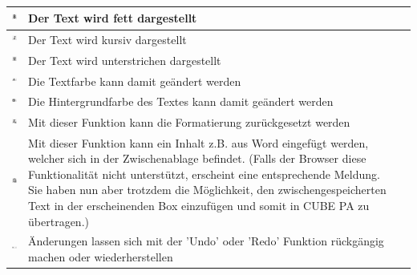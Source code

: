 \begin{tabular}{c | p{14cm} l} %
\hline
\includegraphics[height=12pt]{../chapters/09_Qualitaetsmanagement/pictures/Format/Fett.jpg} & Der Text wird fett dargestellt \\
\hline
\includegraphics[height=12pt]{../chapters/09_Qualitaetsmanagement/pictures/Format/Kursiv.jpg} & Der Text wird kursiv dargestellt \\
\hline
\includegraphics[height=12pt]{../chapters/09_Qualitaetsmanagement/pictures/Format/Unterstrichen.jpg} & Der Text wird unterstrichen dargestellt \\
\hline
\includegraphics[height=12pt]{../chapters/09_Qualitaetsmanagement/pictures/Format/Textfarbe.jpg} & Die Textfarbe kann damit geändert werden \\
\hline
\includegraphics[height=12pt]{../chapters/09_Qualitaetsmanagement/pictures/Format/Hintergrundfarbe.jpg} & Die Hintergrundfarbe des Textes kann damit geändert werden \\
\hline
\includegraphics[height=12pt]{../chapters/09_Qualitaetsmanagement/pictures/Format/Form_z.jpg} & Mit dieser Funktion kann die Formatierung zurückgesetzt werden \\
\hline
\includegraphics[height=12pt]{../chapters/09_Qualitaetsmanagement/pictures/Format/ausWord.jpg} & Mit dieser Funktion kann ein Inhalt z.B. aus Word eingefügt werden, welcher sich in der Zwischenablage befindet. (Falls der Browser diese Funktionalität nicht unterstützt, erscheint eine entsprechende Meldung. Sie haben nun aber trotzdem die Möglichkeit, den zwischengespeicherten Text in der erscheinenden Box einzufügen und somit in CUBE PA zu übertragen.) \\
\hline
\includegraphics[height=12pt]{../chapters/09_Qualitaetsmanagement/pictures/Format/Undo.jpg} & Änderungen lassen sich mit der 'Undo' oder 'Redo' Funktion rückgängig machen oder wiederherstellen \\

\end{tabular}
